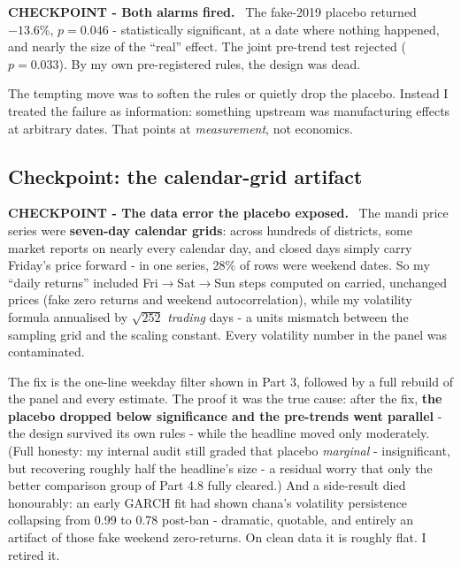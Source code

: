 \documentclass[11pt]{article}
\newenvironment{checkpoint}[1]
  {\begin{framed}\noindent\textbf{CHECKPOINT - #1.}\ }
  {\end{framed}}
\begin{document}
\begin{checkpoint}{Both alarms fired}
The fake-2019 placebo returned $\mathbf{-13.6\%}$, $p=0.046$ - statistically significant,
at a date where nothing happened, and nearly the size of the ``real'' effect. The joint
pre-trend test rejected ($p=0.033$). By my own pre-registered rules, the design was dead.
\end{checkpoint}

The tempting move was to soften the rules or quietly drop the placebo. Instead I treated
the failure as information: something upstream was manufacturing effects at arbitrary
dates. That points at \emph{measurement}, not economics.

\subsection{Checkpoint: the calendar-grid artifact}

\begin{checkpoint}{The data error the placebo exposed}
The mandi price series were \textbf{seven-day calendar grids}: across hundreds of
districts, some market reports on nearly every calendar day, and closed days simply carry
Friday's price forward - in one series, 28\% of rows were weekend dates. So my ``daily
returns'' included Fri$\to$Sat$\to$Sun steps computed on carried, unchanged prices (fake
zero returns and weekend autocorrelation), while my volatility formula annualised by
$\sqrt{252}$ \emph{trading} days - a units mismatch between the sampling grid and the
scaling constant. Every volatility number in the panel was contaminated.
\end{checkpoint}

The fix is the one-line weekday filter shown in Part 3, followed by a full rebuild of the
panel and every estimate. The proof it was the true cause: after the fix, \textbf{the
placebo dropped below significance and the pre-trends went parallel} - the design
survived its own rules - while the headline moved only moderately. (Full honesty: my
internal audit still graded that placebo \emph{marginal} - insignificant, but recovering
roughly half the headline's size - a residual worry that only the better comparison
group of Part 4.8 fully cleared.) And a side-result died honourably: an early
GARCH fit had shown chana's volatility persistence collapsing from 0.99 to 0.78 post-ban -
dramatic, quotable, and entirely an artifact of those fake weekend zero-returns. On clean
data it is roughly flat. I retired it.
\end{document}
